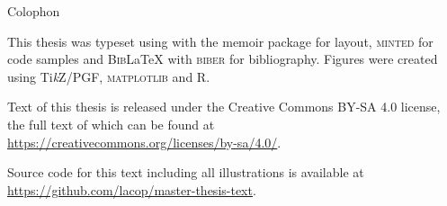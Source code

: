 \clearpage
\pagestyle{empty}
\null\vfil

\begin{adjustwidth}{2cm}{2cm}
\begin{center}
{\LARGE\textsf{Colophon}}

\noindent This thesis was typeset using \textsf{\XeLaTeX} with the \textsf{memoir} package for layout, \textsf{\textsc{minted}} for code samples and \textsf{\textsc{Bib}\LaTeX} with \textsf{\textsc{biber}} for bibliography. Figures were created using \textsf{Ti\textit{k}Z/PGF}, \textsf{\textsc{matplotlib}} and \textsf{\textsc{R}}.

\vspace{2cm}

{\Large \ccbysa}

\noindent Text of this thesis is released under the \textsf{Creative Commons BY-SA 4.0} license, the full text of which can be found at\\
\url{https://creativecommons.org/licenses/by-sa/4.0/}.

\vspace{1cm}

\noindent Source code for this text including all illustrations is available at \url{https://github.com/lacop/master-thesis-text}.
\end{center}
\end{adjustwidth}

\vfil